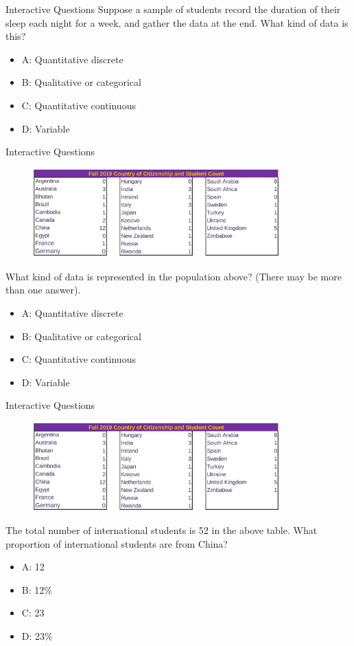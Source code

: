 \documentclass{beamer}
\begin{document}
\begin{frame}{Interactive Questions}
Suppose a sample of students record the duration of their sleep each night for a week, and gather the data at the end.  What kind of data is this?
\begin{itemize}
\item A: Quantitative discrete
\item B: Qualitative or categorical
\item C: Quantitative continuous
\item D: Variable
\end{itemize}
\end{frame}

\begin{frame}{Interactive Questions}
\begin{figure}
\centering
\includegraphics[width=0.85\textwidth]{figures/map.png}
\end{figure}
What kind of data is represented in the population above? (There may be more than one answer).
\begin{itemize}
\item A: Quantitative discrete
\item B: Qualitative or categorical
\item C: Quantitative continuous
\item D: Variable
\end{itemize}
\end{frame}

\begin{frame}{Interactive Questions}
\begin{figure}
\centering
\includegraphics[width=0.85\textwidth]{figures/map.png}
\end{figure}
The total number of international students is 52 in the above table.  What proportion of international students are from China?
\begin{itemize}
\item A: 12
\item B: 12\%
\item C: 23
\item D: 23\%
\end{itemize}
\end{frame}
\end{document}
